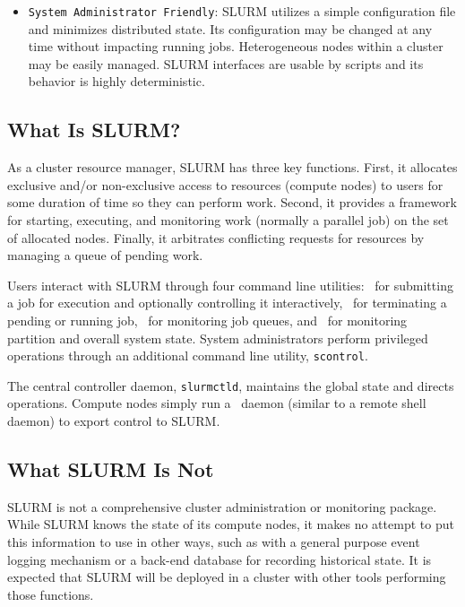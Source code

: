 \documentclass[10pt,onecolumn,times]{../common/llncs}
\begin{document}
{\begin{itemize}
\item {\tt System Administrator Friendly}: SLURM utilizes
a simple configuration file and minimizes distributed state.
Its configuration may be changed at any time without impacting running
jobs.  Heterogeneous nodes within a cluster may be easily managed.  SLURM
interfaces are usable by scripts and its behavior is highly deterministic.

\end{itemize}

\subsection{What Is SLURM?}

As a cluster resource manager, SLURM has three key functions.  First,
it allocates exclusive and/or non-exclusive access to resources (compute
nodes) to users for some duration of time so they can perform work.
Second, it provides a framework for starting, executing, and monitoring
work (normally a parallel job) on the set of allocated nodes.  Finally,
it arbitrates conflicting requests for resources by managing a queue of
pending work.

Users interact with SLURM through four command line utilities: \srun\
for submitting a job for execution and optionally controlling it
interactively, \scancel\ for terminating a pending or running job,
\squeue\ for monitoring job queues, and \sinfo\ for monitoring partition
and overall system state.  System administrators perform privileged
operations through an additional command line utility, {\tt scontrol}.

The central controller daemon, {\tt slurmctld}, maintains the global
state and directs operations.  Compute nodes simply run a \slurmd\ daemon
(similar to a remote shell daemon) to export control to SLURM.

\subsection{What SLURM Is Not}

SLURM is not a comprehensive cluster administration or monitoring package.
While SLURM knows the state of its compute nodes, it makes no attempt
to put this information to use in other ways, such as with a general
purpose event logging mechanism or a back-end database for recording
historical state.  It is expected that SLURM will be deployed in a
cluster with other tools performing those functions.

}
\end{document}
